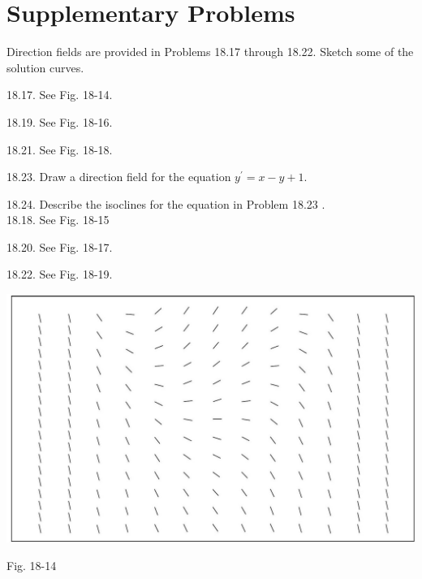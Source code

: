 \documentclass[10pt]{article}
\begin{document}
\section*{Supplementary Problems}
Direction fields are provided in Problems 18.17 through 18.22. Sketch some of the solution curves.

18.17. See Fig. 18-14.

18.19. See Fig. 18-16.

18.21. See Fig. 18-18.

18.23. Draw a direction field for the equation $y^{\prime}=x-y+1$.

18.24. Describe the isoclines for the equation in Problem 18.23 .\\
18.18. See Fig. 18-15

18.20. See Fig. 18-17.

18.22. See Fig. 18-19.

\begin{center}
\includegraphics[max width=\textwidth]{2024_04_03_5bb5b4275a64cb9887d1g-190}
\end{center}

Fig. 18-14
\end{document}
